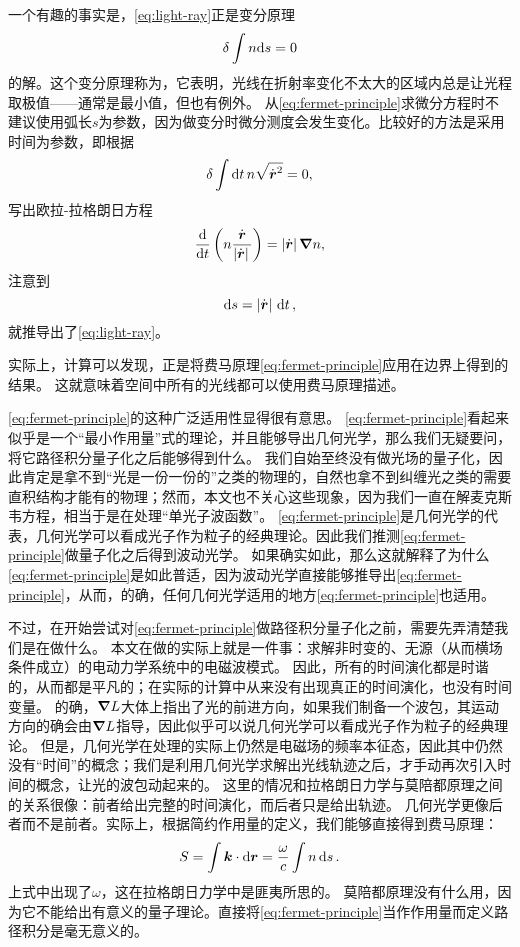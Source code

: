 一个有趣的事实是，\eqref{eq:light-ray}正是变分原理
\begin{equation}
    \var \int n \dd s = 0
    \label{eq:fermet-principle}
\end{equation}
的解。这个变分原理称为，它表明，光线在折射率变化不太大的区域内总是让光程取极值——通常是最小值，但也有例外。
从\eqref{eq:fermet-principle}求微分方程时不建议使用弧长$s$为参数，因为做变分时微分测度会发生变化。比较好的方法是采用时间为参数，即根据
\[
    \var \int \dd{t} n \sqrt{\dot{\vb*{r}}^2} = 0,
\]
写出欧拉-拉格朗日方程
\[
    \dv{t}\left( n \frac{\dot{\vb*{r}}}{\abs*{\dot{\vb*{r}}}} \right) = \abs*{\dot{\vb*{r}}} \grad{n},
\]
注意到
\[
    \dd{s} = \abs*{\dot{\vb*{r}}} \dd{t},
\]
就推导出了\eqref{eq:light-ray}。

实际上，计算可以发现，正是将费马原理\eqref{eq:fermet-principle}应用在边界上得到的结果。
这就意味着空间中所有的光线都可以使用费马原理描述。

\eqref{eq:fermet-principle}的这种广泛适用性显得很有意思。
\eqref{eq:fermet-principle}看起来似乎是一个“最小作用量”式的理论，并且能够导出几何光学，那么我们无疑要问，将它路径积分量子化之后能够得到什么。
我们自始至终没有做光场的量子化，因此肯定是拿不到“光是一份一份的”之类的物理的，自然也拿不到纠缠光之类的需要直积结构才能有的物理；然而，本文也不关心这些现象，因为我们一直在解麦克斯韦方程，相当于是在处理“单光子波函数”。
\eqref{eq:fermet-principle}是几何光学的代表，几何光学可以看成光子作为粒子的经典理论。因此我们推测\eqref{eq:fermet-principle}做量子化之后得到波动光学。
如果确实如此，那么这就解释了为什么\eqref{eq:fermet-principle}是如此普适，因为波动光学直接能够推导出\eqref{eq:fermet-principle}，从而，的确，任何几何光学适用的地方\eqref{eq:fermet-principle}也适用。

不过，在开始尝试对\eqref{eq:fermet-principle}做路径积分量子化之前，需要先弄清楚我们是在做什么。
本文在做的实际上就是一件事：求解非时变的、无源（从而横场条件成立）的电动力学系统中的电磁波模式。
因此，所有的时间演化都是时谐的，从而都是平凡的；在实际的计算中从来没有出现真正的时间演化，也没有时间变量。
的确，$\grad{L}$大体上指出了光的前进方向，如果我们制备一个波包，其运动方向的确会由$\grad{L}$指导，因此似乎可以说几何光学可以看成光子作为粒子的经典理论。
但是，几何光学在处理的实际上仍然是电磁场的频率本征态，因此其中仍然没有“时间”的概念；我们是利用几何光学求解出光线轨迹之后，才手动再次引入时间的概念，让光的波包动起来的。
这里的情况和拉格朗日力学与莫陪都原理之间的关系很像：前者给出完整的时间演化，而后者只是给出轨迹。
几何光学更像后者而不是前者。实际上，根据简约作用量的定义，我们能够直接得到费马原理：
\begin{equation}
    S = \int \vb*{k} \cdot \dd{\vb*{r}} = \frac{\omega}{c} \int n \dd{s}.
    \label{eq:abbr-action-ray}
\end{equation}
上式中出现了$\omega$，这在拉格朗日力学中是匪夷所思的。
莫陪都原理没有什么用，因为它不能给出有意义的量子理论。直接将\eqref{eq:fermet-principle}当作作用量而定义路径积分是毫无意义的。

